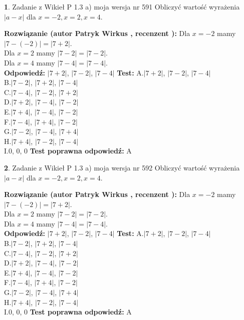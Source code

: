 \documentclass[12pt, a4paper]{article}
\theoremstyle{definition} %
\newtheorem{zad}{}
\newcommand{\zadStart}[1]{\begin{zad}#1\newline}
\newcommand{\zadStop}{\end{zad}}
\newcommand{\rozwStart}[2]{\noindent \textbf{Rozwiązanie (autor #1 , recenzent #2): }\newline}
\newcommand{\rozwStop}{\newline}
\newcommand{\odpStart}{\noindent \textbf{Odpowiedź:}\newline}
\newcommand{\odpStop}{\newline}
\newcommand{\testStart}{\noindent \textbf{Test:}\newline}
\newcommand{\testStop}{\newline}
\newcommand{\kluczStart}{\noindent \textbf{Test poprawna odpowiedź:}\newline}
\newcommand{\kluczStop}{\newline}
\begin{document}
\zadStart{Zadanie z Wikieł P 1.3 a) moja wersja nr 591}
Obliczyć wartość wyrażenia $|a - x|$ dla $x=-2,x=2,x=4$.
\zadStop
\rozwStart{Patryk Wirkus}{}
Dla $x = -2$ mamy $|7 - (-2)| = |7 + 2|$.\\
Dla $x = 2$ mamy $|7 - 2| = |7 - 2|$.\\
Dla $x = 4$ mamy $|7 - 4| = |7 - 4|$.\\
\rozwStop
\odpStart
$|7 + 2|$, $|7 - 2|$, $|7 - 4|$
\odpStop
\testStart
A.$|7 + 2|$, $|7 - 2|$, $|7 - 4|$\\
B.$|7 - 2|$, $|7 + 2|$, $|7 - 4|$\\
C.$|7 - 4|$, $|7 - 2|$, $|7 + 2|$\\
D.$|7 + 2|$, $|7 - 4|$, $|7 - 2|$\\
E.$|7 + 4|$, $|7 - 4|$, $|7 - 2|$\\
F.$|7 - 4|$, $|7 + 4|$, $|7 - 2|$\\
G.$|7 - 2|$, $|7 - 4|$, $|7 + 4|$\\
H.$|7 + 4|$, $|7 - 2|$, $|7 - 4|$\\
I.$0$, $0$, $0$
\testStop
\kluczStart
A
\kluczStop



\zadStart{Zadanie z Wikieł P 1.3 a) moja wersja nr 592}
Obliczyć wartość wyrażenia $|a - x|$ dla $x=-2,x=2,x=4$.
\zadStop
\rozwStart{Patryk Wirkus}{}
Dla $x = -2$ mamy $|7 - (-2)| = |7 + 2|$.\\
Dla $x = 2$ mamy $|7 - 2| = |7 - 2|$.\\
Dla $x = 4$ mamy $|7 - 4| = |7 - 4|$.\\
\rozwStop
\odpStart
$|7 + 2|$, $|7 - 2|$, $|7 - 4|$
\odpStop
\testStart
A.$|7 + 2|$, $|7 - 2|$, $|7 - 4|$\\
B.$|7 - 2|$, $|7 + 2|$, $|7 - 4|$\\
C.$|7 - 4|$, $|7 - 2|$, $|7 + 2|$\\
D.$|7 + 2|$, $|7 - 4|$, $|7 - 2|$\\
E.$|7 + 4|$, $|7 - 4|$, $|7 - 2|$\\
F.$|7 - 4|$, $|7 + 4|$, $|7 - 2|$\\
G.$|7 - 2|$, $|7 - 4|$, $|7 + 4|$\\
H.$|7 + 4|$, $|7 - 2|$, $|7 - 4|$\\
I.$0$, $0$, $0$
\testStop
\kluczStart
A
\kluczStop
\end{document}
